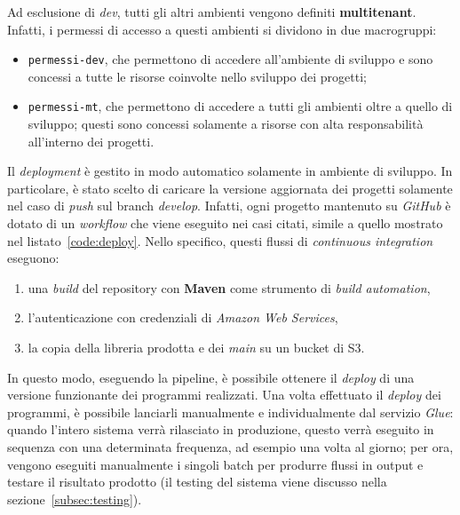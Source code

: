 Ad esclusione di \textit{dev}, tutti gli altri ambienti vengono definiti \textbf{multitenant}.
Infatti, i permessi di accesso a questi ambienti si dividono in due macrogruppi:
\begin{itemize}
    \item \texttt{permessi-dev}, che permettono di accedere all'ambiente di sviluppo e sono concessi a tutte le risorse coinvolte nello sviluppo dei progetti;
    \item \texttt{permessi-mt}, che permettono di accedere a tutti gli ambienti oltre a quello di sviluppo;
    questi sono concessi solamente a risorse con alta responsabilità all'interno dei progetti.
\end{itemize}

Il \textit{deployment} è gestito in modo automatico solamente in ambiente di sviluppo.
In particolare, è stato scelto di caricare la versione aggiornata dei progetti solamente nel caso di \textit{push} sul branch \textit{develop}.
Infatti, ogni progetto mantenuto su \textit{GitHub} è dotato di un \textit{workflow} che viene eseguito nei casi citati, simile a quello mostrato nel listato~\ref{code:deploy}.
Nello specifico, questi flussi di \textit{continuous integration} eseguono:
\begin{enumerate}
    \item una \textit{build} del repository con \textbf{Maven} come strumento di \textit{build automation},
    \item l'autenticazione con credenziali di \textit{Amazon Web Services},
    \item la copia della libreria prodotta e dei \textit{main} su un bucket di S3.
\end{enumerate}
In questo modo, eseguendo la pipeline, è possibile ottenere il \textit{deploy} di una versione funzionante dei programmi realizzati.
Una volta effettuato il \textit{deploy} dei programmi, è possibile lanciarli manualmente e individualmente dal servizio \textit{Glue}:
quando l'intero sistema verrà rilasciato in produzione, questo verrà eseguito in sequenza con una determinata frequenza, ad esempio una volta al giorno;
per ora, vengono eseguiti manualmente i singoli batch per produrre flussi in output e testare il risultato prodotto (il testing del sistema viene discusso nella sezione~\ref{subsec:testing}).

